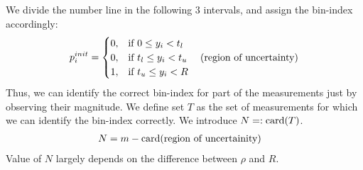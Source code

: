 %			
We divide the number line in the following $3$ intervals, and assign the bin-index accordingly:
\begin{equation}
{p}^{init}_{i} = 
\begin{cases}
0,& \text{if } 0\leq y_i < t_l \\
0,& \text{if } t_l\leq y_i < t_u ~~~~ \textnormal{(region of uncertainty)} \\
1,& \text{if } t_u \leq y_i < R \\
\end{cases}
\label{eq:rcm}
\end{equation}
Thus, we can identify the correct bin-index for part of the measurements just by observing their magnitude. We define set $T$ as the set of measurements for which we can identify the bin-index correctly. We introduce $N=: \mathrm{card}(T)$.
\begin{align*}
N & =  m - \mathrm{card}(\textnormal{region of uncertainity})
\end{align*}
Value of $N$ largely depends on the difference between $\rho$ and $R$.

